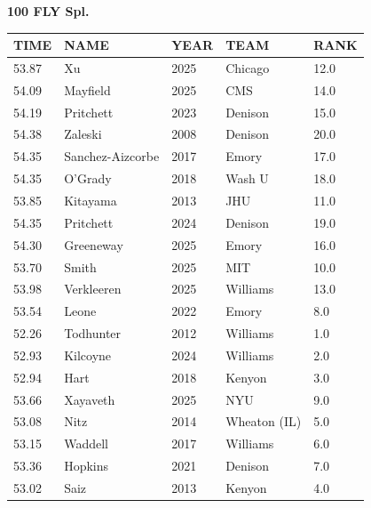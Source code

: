 \begin{table}[H]
\centering
\begin{minipage}[t]{0.6\textwidth}
\centering
\textbf{100 FLY Spl.}\\[0.1cm]
\begin{tabular}{@{}p{1.8cm}p{2.8cm}p{1.2cm}p{1.4cm}p{0.8cm}@{}}
\hline
    \textbf{TIME} & \textbf{NAME} & \textbf{YEAR} & \textbf{TEAM} & \textbf{RANK} \\
\hline
    53.87 & Xu & 2025 & Chicago & 12.0 \\
    54.09 & Mayfield & 2025 & CMS & 14.0 \\
    54.19 & Pritchett & 2023 & Denison & 15.0 \\
    54.38 & Zaleski & 2008 & Denison & 20.0 \\
    54.35 & Sanchez-Aizcorbe & 2017 & Emory & 17.0 \\
    54.35 & O'Grady & 2018 & Wash U & 18.0 \\
    53.85 & Kitayama & 2013 & JHU & 11.0 \\
    54.35 & Pritchett & 2024 & Denison & 19.0 \\
    54.30 & Greeneway & 2025 & Emory & 16.0 \\
    53.70 & Smith & 2025 & MIT & 10.0 \\
    53.98 & Verkleeren & 2025 & Williams & 13.0 \\
    53.54 & Leone & 2022 & Emory & 8.0 \\
    52.26 & Todhunter & 2012 & Williams & 1.0 \\
    52.93 & Kilcoyne & 2024 & Williams & 2.0 \\
    52.94 & Hart & 2018 & Kenyon & 3.0 \\
    53.66 & Xayaveth & 2025 & NYU & 9.0 \\
    53.08 & Nitz & 2014 & Wheaton (IL) & 5.0 \\
    53.15 & Waddell & 2017 & Williams & 6.0 \\
    53.36 & Hopkins & 2021 & Denison & 7.0 \\
    53.02 & Saiz & 2013 & Kenyon & 4.0 \\
\hline
\end{tabular}
\end{minipage}
\end{table}


\newpage



